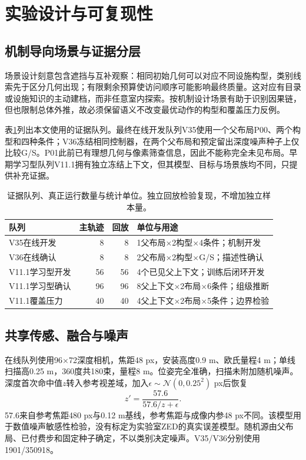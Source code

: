 \documentclass[11pt,a4paper]{article}
\begin{document}
\section{实验设计与可复现性}
\subsection{机制导向场景与证据分层}
场景设计刻意包含遮挡与互补观察：相同初始几何可以对应不同设施构型，类别线索先于区分几何出现；有限剩余预算使访问顺序可能影响最终质量。这对应有目录或设施知识的主动建档，而非任意室内探索。按机制设计场景有助于识别因果链，但也限制总体外推，故必须保留语义不改变最优动作的构型和覆盖压力反例。

表\ref{tab:cohorts}列出本文使用的证据队列。最终在线开发队列V35使用一个父布局P00、两个构型和四种条件；V36冻结相同控制器，在两个父布局和预定留出深度噪声种子上仅比较G/S。P01此前已有理想几何与像素筛查信息，因此不能称完全未见布局。早期学习型队列V11.1拥有独立冻结上下文，但其模型、目标与场景族均不同，只提供补充证据。

\begin{table}[tb]
\centering\small
\caption{证据队列、真正运行数量与统计单位。独立回放检验复现，不增加独立样本量。}
\label{tab:cohorts}
\begin{tabular}{p{.24\linewidth}rrp{.37\linewidth}}
\toprule
队列 & 主轨迹 & 回放 & 单位与用途\\\midrule
V35在线开发 & 8 & 8 & 1父布局$\times$2构型$\times$4条件；机制开发\\
V36在线确认 & 8 & 8 & 2父布局$\times$2构型$\times$G/S；描述性确认\\
V11.1学习型开发 & 56 & 56 & 4个已见父上下文；训练后闭环开发\\
V11.1学习型确认 & 96 & 96 & 8父上下文$\times$2布局$\times$6条件；组级推断\\
V11.1覆盖压力 & 40 & 40 & 4父上下文$\times$2布局$\times$5条件；边界检验\\\bottomrule
\end{tabular}
\end{table}

\subsection{共享传感、融合与噪声}
在线队列使用96$\times$72深度相机，焦距48 px，安装高度0.9 m、欧氏量程4 m；单线扫描高0.25 m，360度共180束，量程8 m。位姿完全准确，扫描未附加随机噪声。深度首次命中值$z$转入参考视差域，加入$\epsilon\sim\mathcal N(0,0.25^2)$ px后恢复
\begin{equation}
z'=\frac{57.6}{57.6/z+\epsilon}.
\end{equation}
57.6来自参考焦距480 px与0.12 m基线，参考焦距与成像内参48 px不同。该模型用于数值噪声敏感性检验，没有标定为实验室ZED的真实误差模型。随机源由父布局、已付费步和固定种子确定，不以类别决定噪声。V35/V36分别使用1901/350918。
\end{document}

